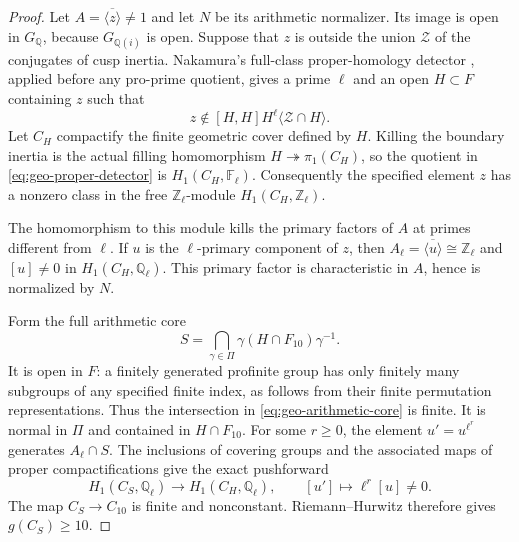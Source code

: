 \documentclass[11pt]{article}
\theoremstyle{definition}\newtheorem{definition}[theorem]{Definition}
\begin{document}
\begin{proof}
Let \(A=\overline{\langle z\rangle}\neq1\) and let \(N\) be its
arithmetic normalizer.  Its image is open in \(G_{\mathbb Q}\),
because \(G_{\mathbb Q(i)}\) is open.
Suppose that \(z\) is outside the union \(\mathcal Z\) of the
conjugates of cusp inertia.
Nakamura's full-class proper-homology detector
\cite[Lemma 2.1.4, pp.~96--97]{Nakamura1994}, applied before any
pro-prime quotient, gives a prime \(\ell\) and an open
\(H\subset F\) containing \(z\) such that
\begin{equation}\label{eq:geo-proper-detector}
 z\notin[H,H]H^\ell\langle\mathcal Z\cap H\rangle.
\end{equation}
Let \(C_H\) compactify the finite geometric cover defined by \(H\).
Killing the boundary inertia is the actual filling homomorphism
\(H\twoheadrightarrow\pi_1(C_H)\), so the quotient in
\eqref{eq:geo-proper-detector} is
\(H_1(C_H,\mathbb F_\ell)\).
Consequently the specified element \(z\) has a nonzero class
in the free \(\mathbb Z_\ell\)-module \(H_1(C_H,\mathbb Z_\ell)\).

The homomorphism to this module kills the primary factors
of \(A\) at primes different from \(\ell\).
If \(u\) is the \(\ell\)-primary component of \(z\), then
\(A_\ell=\overline{\langle u\rangle}\cong\mathbb Z_\ell\)
and \([u]\neq0\) in \(H_1(C_H,\mathbb Q_\ell)\).
This primary factor is characteristic in \(A\), hence is
normalized by \(N\).

Form the full arithmetic core
\begin{equation}\label{eq:geo-arithmetic-core}
 S=\bigcap_{\gamma\in\Pi}\gamma(H\cap F_{10})\gamma^{-1}.
\end{equation}
It is open in \(F\): a finitely generated profinite group
has only finitely many subgroups of any specified finite index,
as follows from their finite permutation representations.
Thus the intersection in \eqref{eq:geo-arithmetic-core} is finite.
It is normal in \(\Pi\) and contained in \(H\cap F_{10}\).
For some \(r\geq0\), the element \(u'=u^{\ell^r}\) generates
\(A_\ell\cap S\).
The inclusions of covering groups and the associated maps of
proper compactifications give the exact pushforward
\begin{equation}\label{eq:geo-pushforward-class}
 H_1(C_S,\mathbb Q_\ell)\longrightarrow H_1(C_H,\mathbb Q_\ell),
 \qquad [u']\longmapsto\ell^r[u]\neq0.
\end{equation}
The map \(C_S\to C_{10}\) is finite and nonconstant.
Riemann--Hurwitz therefore gives \(g(C_S)\geq10\).


\end{proof}
\end{document}
